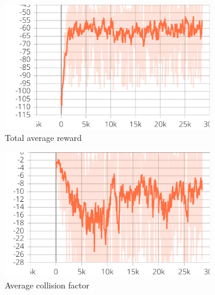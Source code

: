 \documentclass[12pt,a4paper,openright,twoside]{book}
\begin{document}
\begin{figure}[t]
\begin{subfigure}[b]{0.32\textwidth}
        \end{subfigure}
        \par\bigskip
        \begin{subfigure}[b]{0.32\textwidth}
            \centering
            \includegraphics[width=\textwidth]{figures/reward-dtde.pdf}
            \caption{Total average reward}
            \label{fig:reward-dcc}
        \end{subfigure}
        \hfill
        \begin{subfigure}[b]{0.32\textwidth}
            \centering
            \includegraphics[width=\textwidth]{figures/collision-dtde.pdf}
            \caption{Average collision factor}
            \label{fig:collision-dcc}
        \end{subfigure}
        \hfill
        \begin{subfigure}[b]{0.32\textwidth}
            \centering

\end{subfigure}
\end{figure}
\end{document}
